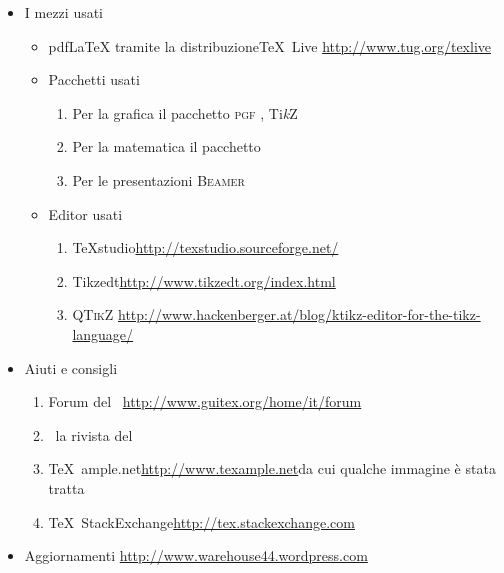 	\begin{itemize}
		\item I mezzi usati
		\begin{itemize}
			\item pdf\LaTeX{} tramite la distribuzione\TeX{}~Live\newline
			\url{http://www.tug.org/texlive}
			\item Pacchetti usati
			\begin{enumerate}
				\item Per la grafica  il pacchetto \textsc{pgf} \pgfversion, Ti\emph{k}Z
				\item Per la matematica il pacchetto \AmS
				\item Per le presentazioni \textsc{Beamer}
			\end{enumerate}
			\item Editor usati
			\begin{enumerate}
				\item \TeX{}studio\newline \url{http://texstudio.sourceforge.net/} %
				\item Tikzedt\newline \url{http://www.tikzedt.org/index.html} %
				\item \textsc{QTikZ}\newline
				\url{http://www.hackenberger.at/blog/ktikz-editor-for-the-tikz-language/}
			\end{enumerate}
		\end{itemize}
		\item Aiuti e consigli
		\begin{enumerate}
			\item Forum del \guit\ \GuITtext\newline \url{http://www.guitex.org/home/it/forum}
			\item \Ars\ la rivista del \guit\
			\item \TeX{}~ample.net\newline \url{http://www.texample.net}\newline da cui qualche immagine è stata tratta
			\item \TeX{}~StackExchange\newline \url{http://tex.stackexchange.com}
		\end{enumerate}
		\item Aggiornamenti
	    \url{http://www.warehouse44.wordpress.com}
	\end{itemize}
	\clearpage